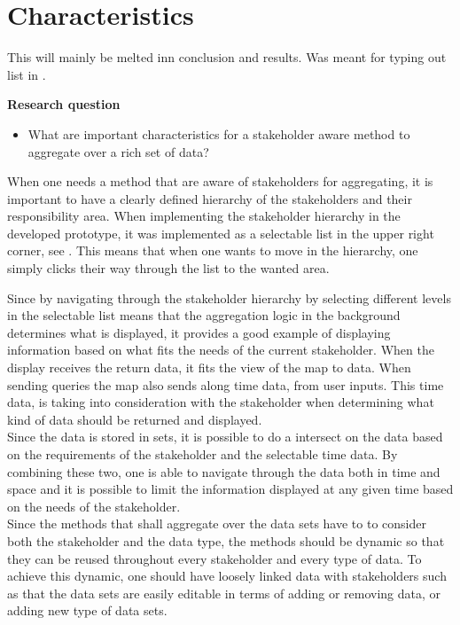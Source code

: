 
\section{Characteristics} %
\label{sec:characteristics}
This will mainly be melted inn conclusion and results. Was meant for typing out
list in .

\textbf{Research question}
\begin{itemize}
	\item What are important characteristics for a stakeholder aware method to 
	aggregate over a rich set of data?
\end{itemize}

When one needs a method that are aware of stakeholders for aggregating, it is
important to have a clearly defined hierarchy of the stakeholders and their 
responsibility area. When implementing the stakeholder hierarchy in the
developed prototype, it was implemented as a selectable list in the upper right
corner, see . This means that when 
one wants to move in the hierarchy, one simply clicks their way through the list to the wanted area.


Since by navigating through the stakeholder hierarchy by selecting different
levels in the selectable list means that the aggregation logic in the 
background determines what is displayed, it provides a good example of
displaying information based on what fits the needs of the current stakeholder.
When the display receives the return data, it fits the view of the map to
data. When sending queries the map also sends along time data, from user 
inputs. This time data, is taking into consideration with the stakeholder when 
determining what kind of data should be returned and displayed.\\

Since the data is stored in sets, it is possible to do a intersect on the data
based on the requirements of the stakeholder and the selectable time data.
By combining these two, one is able to navigate through the  data both in time 
and space and it is possible to limit the information displayed at any given
time based on the needs of the stakeholder.\\


Since the methods that shall aggregate over the data sets have to to consider
both the stakeholder and the data type, the methods should be dynamic so that
they can be reused throughout every stakeholder and every type of data. To 
achieve this dynamic, one should have loosely linked data with stakeholders
such as that the data sets are easily editable in terms of adding or removing
data, or adding new type of data sets.

